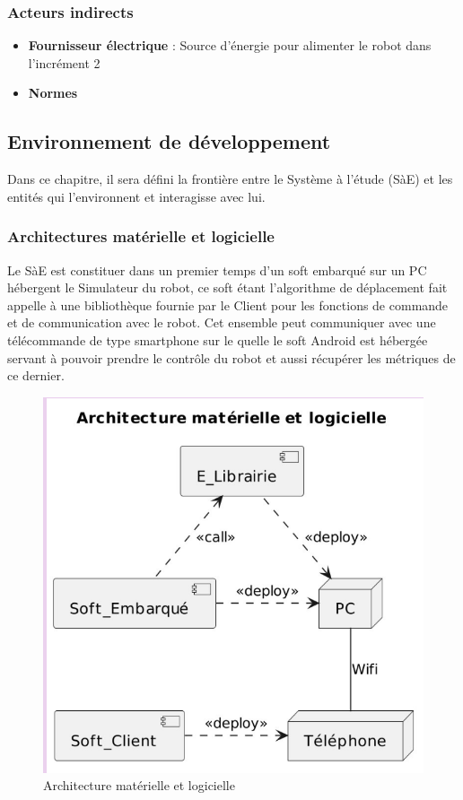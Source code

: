 \subsubsection{Acteurs indirects}

\begin{itemize}
    \item \textbf{Fournisseur électrique} : Source d'énergie pour alimenter le robot dans l'incrément 2
    \item \textbf{Normes}
\end{itemize}

\subsection{Environnement de développement}

Dans ce chapitre, il sera défini la frontière entre le Système à l'étude (SàE) et les entités qui l'environnent et interagisse avec lui.

\subsubsection{Architectures matérielle et logicielle}

Le SàE est constituer dans un premier temps d'un soft embarqué sur un PC hébergent le Simulateur du robot, ce soft étant l'algorithme de déplacement fait appelle à une bibliothèque fournie par le Client pour les fonctions de commande et de communication avec le robot. Cet ensemble peut communiquer avec une télécommande de type smartphone sur le quelle le soft Android est hébergée servant à pouvoir prendre le contrôle du robot et aussi récupérer les métriques de ce dernier.

\begin{figure}[H]
    \center
    \includegraphics[scale=0.25]{data/arch_mat_log.png}
    \caption{Architecture matérielle et logicielle}
    \label{fig:architecture}
\end{figure}

